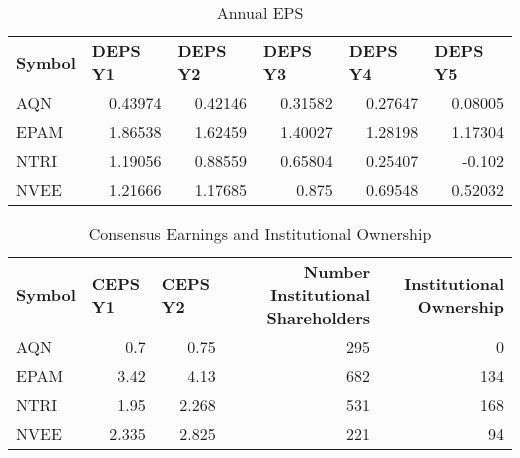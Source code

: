 \documentclass{article}
\begin{document}
\begin{table}[htbp]
  \caption{Annual EPS}
      \begin{tabular}{lrrrrr}
    \textbf{Symbol} & \multicolumn{1}{l}{\textbf{DEPS Y1}} & \multicolumn{1}{l}{\textbf{DEPS Y2}} & \multicolumn{1}{l}{\textbf{DEPS Y3}} & \multicolumn{1}{l}{\textbf{DEPS Y4}} & \multicolumn{1}{l}{\textbf{DEPS Y5}} \\
    AQN   & 0.43974 & 0.42146 & 0.31582 & 0.27647 & 0.08005 \\
    EPAM  & 1.86538 & 1.62459 & 1.40027 & 1.28198 & 1.17304 \\
    NTRI  & 1.19056 & 0.88559 & 0.65804 & 0.25407 & -0.102 \\
    NVEE  & 1.21666 & 1.17685 & 0.875 & 0.69548 & 0.52032 \\
    \end{tabular}%
  \label{tab:addlabel}%
\end{table}%

\begin{table}[htbp]
  \caption{Consensus Earnings and Institutional Ownership}
    \begin{tabular}{lrrrr}
    \textbf{Symbol} & \multicolumn{1}{l}{\textbf{CEPS Y1}} & \multicolumn{1}{l}{\textbf{CEPS Y2}} & \multicolumn{1}{p{4.215em}}{\textbf{Number Institutional Shareholders}} & \multicolumn{1}{p{4.215em}}{\textbf{Institutional Ownership}} \\
    AQN   & 0.7   & 0.75  & 295   & 0 \\
    EPAM  & 3.42  & 4.13  & 682   & 134 \\
    NTRI  & 1.95  & 2.268 & 531   & 168 \\
    NVEE  & 2.335 & 2.825 & 221   & 94 \\
    \end{tabular}%
  \label{tab:addlabel}%
\end{table}%
\end{document}
